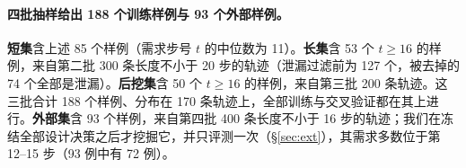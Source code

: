 \paragraph{四批抽样给出 188 个训练样例与 93 个外部样例。} \textbf{短集}含上述 85 个样例（需求步号 $t$ 的中位数为 11）。\textbf{长集}含 53 个 $t\ge16$ 的样例，来自第二批 300 条长度不小于 20 步的轨迹（泄漏过滤前为 127 个，被去掉的 74 个全部是泄漏）。\textbf{后挖集}含 50 个 $t\ge16$ 的样例，来自第三批 200 条轨迹。这三批合计 188 个样例、分布在 170 条轨迹上，全部训练与交叉验证都在其上进行。\textbf{外部集}含 93 个样例，来自第四批 400 条长度不小于 16 步的轨迹；我们在冻结全部设计决策之后才挖掘它，并只评测一次（\S\ref{sec:ext}），其需求多数位于第 12--15 步（93 例中有 72 例）。
